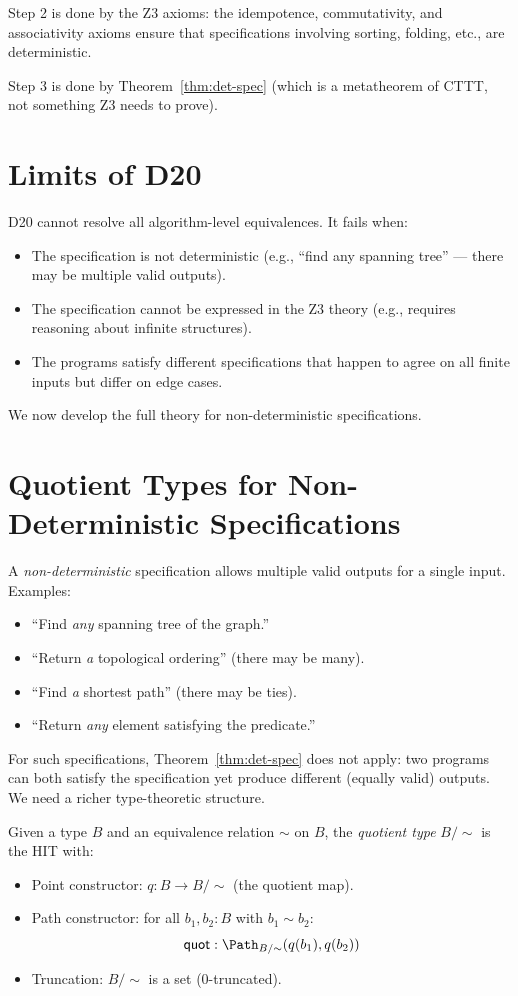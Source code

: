 Step 2 is done by the Z3 axioms: the idempotence, commutativity,
and associativity axioms ensure that specifications involving sorting,
folding, etc., are deterministic.

Step 3 is done by Theorem~\ref{thm:det-spec} (which is a metatheorem
of CTTT, not something Z3 needs to prove).

\section{Limits of D20}

D20 cannot resolve all algorithm-level equivalences.  It fails when:
\begin{itemize}
  \item The specification is not deterministic (e.g., ``find any
    spanning tree'' --- there may be multiple valid outputs).
  \item The specification cannot be expressed in the Z3 theory
    (e.g., requires reasoning about infinite structures).
  \item The programs satisfy different specifications that happen
    to agree on all finite inputs but differ on edge cases.
\end{itemize}

We now develop the full theory for non-deterministic specifications.

\section{Quotient Types for Non-Deterministic Specifications}

A \emph{non-deterministic} specification allows multiple valid outputs
for a single input.  Examples:
\begin{itemize}
  \item ``Find \emph{any} spanning tree of the graph.''
  \item ``Return \emph{a} topological ordering'' (there may be many).
  \item ``Find \emph{a} shortest path'' (there may be ties).
  \item ``Return \emph{any} element satisfying the predicate.''
\end{itemize}

For such specifications, Theorem~\ref{thm:det-spec} does not apply:
two programs can both satisfy the specification yet produce different
(equally valid) outputs.  We need a richer type-theoretic structure.

\begin{definition}
\label{def:quotient}
Given a type $B$ and an equivalence relation $\sim$ on $B$, the
\emph{quotient type} $B / {\sim}$ is the HIT with:
\begin{itemize}
  \item Point constructor: $q : B \to B / {\sim}$
    (the quotient map).
  \item Path constructor: for all $b_1, b_2 : B$ with $b_1 \sim b_2$:
    \[
      \mathsf{quot} : \Path_{B/{\sim}}(q(b_1), q(b_2))
    \]
  \item Truncation: $B / {\sim}$ is a set (0-truncated).
\end{itemize}
\end{definition}

